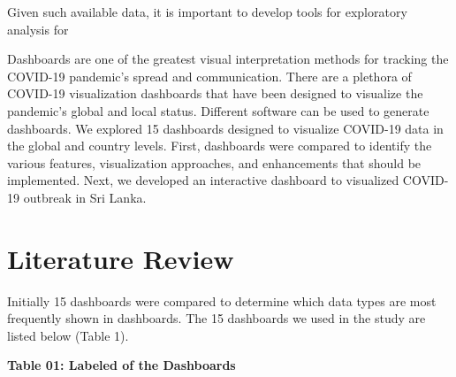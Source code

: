 \documentclass[
]{article}
\begin{document}
Given such available data, it is important to develop tools for
exploratory analysis for

Dashboards are one of the greatest visual interpretation methods for
tracking the COVID-19 pandemic's spread and communication. There are a
plethora of COVID-19 visualization dashboards that have been designed to
visualize the pandemic's global and local status. Different software can
be used to generate dashboards. We explored 15 dashboards designed to
visualize COVID-19 data in the global and country levels. First,
dashboards were compared to identify the various features, visualization
approaches, and enhancements that should be implemented. Next, we
developed an interactive dashboard to visualized COVID-19 outbreak in
Sri Lanka.

\hypertarget{literature-review}{%
\section{Literature Review}\label{literature-review}}

Initially 15 dashboards were compared to determine which data types are
most frequently shown in dashboards. The 15 dashboards we used in the
study are listed below (Table 1).

\textbf{Table 01: Labeled of the Dashboards}
\end{document}
